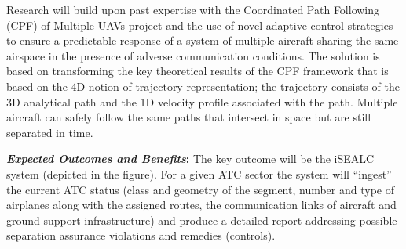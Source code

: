 \documentclass[letter,onecolumn,12pt]{aiaa-tc}
\newcommand{\1}{1_n}
\begin{document}
Research will build upon past expertise with the Coordinated Path Following (CPF) of Multiple UAVs project and
the use of novel adaptive control strategies to ensure a predictable response of a system of multiple aircraft
sharing the same airspace in the presence of adverse communication conditions.
The solution is based on transforming the key theoretical results of the CPF framework that is based on the 4D notion of trajectory representation; the trajectory consists of the 3D analytical path and the 1D velocity profile associated with the path. Multiple aircraft can safely follow the same paths that intersect in space but are still separated in time.


\medskip

\textbf{\emph{Expected Outcomes and Benefits}:} The key outcome will be the iSEALC system (depicted in the figure). For a given ATC sector the system will ``ingest'' the current ATC status (class and geometry of the segment, number and type of airplanes along with the assigned routes,  the communication links of aircraft and ground support infrastructure) and produce a detailed report addressing possible separation assurance violations and remedies (controls).

\end{document}
